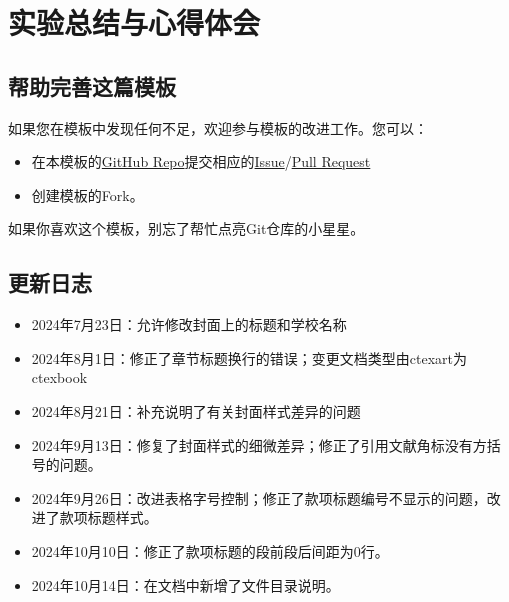 \chapter{实验总结与心得体会}

\section{帮助完善这篇模板}\label{sec:joinus}

如果您在模板中发现任何不足，欢迎参与模板的改进工作。您可以：

\begin{itemize}
    \item 在本模板的\href{https://github.com/GitHubonline1396529/dlmuucexpreport}{GitHub Repo}提交相应的\href{https://github.com/GitHubonline1396529/dlmuucexpreport/issues}{Issue}/\href{https://github.com/GitHubonline1396529/dlmuucexpreport/pulls}{Pull Request}
    \item 创建模板的Fork。
\end{itemize}

如果你喜欢这个模板，别忘了帮忙点亮Git仓库的小星星。

\section{更新日志}

\begin{itemize}
    \item 2024年7月23日：允许修改封面上的标题和学校名称
    \item 2024年8月1日：修正了章节标题换行的错误；变更文档类型由ctexart为ctexbook
    \item 2024年8月21日：补充说明了有关封面样式差异的问题
    \item 2024年9月13日：修复了封面样式的细微差异；修正了引用文献角标没有方括号的问题。
    \item 2024年9月26日：改进表格字号控制；修正了款项标题编号不显示的问题，改进了款项标题样式。
    \item 2024年10月10日：修正了款项标题的段前段后间距为0行。
    \item 2024年10月14日：在文档中新增了文件目录说明。
\end{itemize}